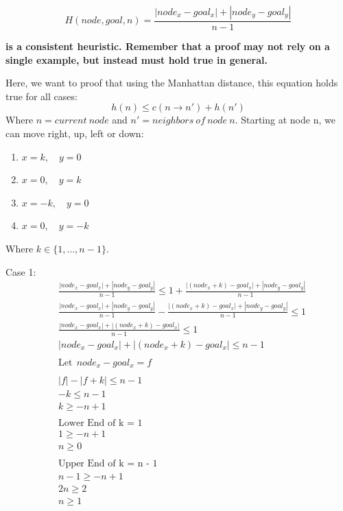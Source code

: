 \documentclass[a4paper]{article}
\begin{document}
\begin{sloppypar}
\begin{enumerate}[start=6,label=Q\arabic*,left=0pt]
    \[ H(node, goal, n) = \frac{|node_x - goal_x| + |node_y - goal_y|}{n - 1} \]

    \textbf{is a consistent heuristic. Remember that a proof may not rely on a single example, but instead must hold true in general.}
    
    \par Here, we want to proof that using the Manhattan distance, this equation holds true for all cases:
    \[ h(n) \leq c(n \rightarrow n') + h(n') \]
    Where $n = current\:node$ and $n' = neighbors\:of\:node\:n$. Starting at node n, we can move right, up, left or down:
    \begin{enumerate}[start=1,label=\arabic*.,left=0pt]
        \item $ x = k, \quad y = 0 $
        \item $ x = 0, \quad y = k $ 
        \item $ x = -k, \quad y = 0 $
        \item $ x = 0, \quad y = -k $
    \end{enumerate}

    Where $ k \in \{1, \ldots, n-1\} $.

    Case 1:
    \begin{align*}
        &\frac{|node_x - goal_x| + |node_y - goal_y|}{n - 1} \leq 1 + \frac{|(node_x + k) - goal_x| + |node_y - goal_y|}{n - 1} \\
        &\frac{|node_x - goal_x| + |node_y - goal_y|}{n - 1} - \frac{|(node_x + k) - goal_x| + |node_y - goal_y|}{n - 1} \leq 1 \\
        &\frac{|node_x - goal_x| + |(node_x + k) - goal_x|}{n - 1} \leq 1 \\
        &|node_x - goal_x| + |(node_x + k) - goal_x| \leq n - 1 \\\\
        &\text{Let} \:\: node_x - goal_x = f \\\\
        &|f| - |f + k| \leq n - 1 \\
        &-k \leq n - 1 \\
        &k \geq -n + 1 \\\\
        &\text{Lower End of k = 1} \\
        &1 \geq -n + 1 \\
        &n \geq 0 \\\\
        &\text{Upper End of k = n - 1} \\
        &n - 1 \geq -n + 1 \\
        &2n \geq 2 \\
        &n \geq 1
    \end{align*}


\end{enumerate}
\end{sloppypar}
\end{document}
